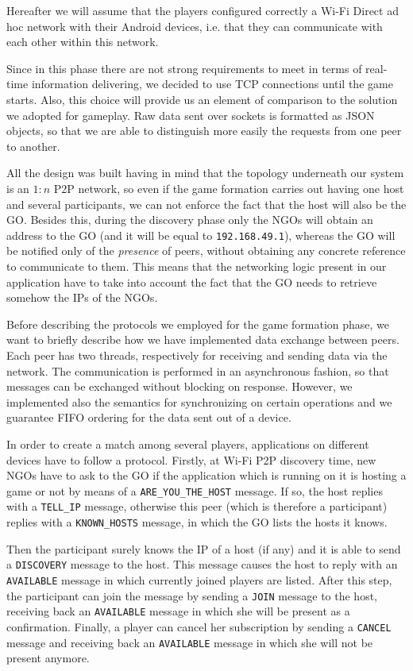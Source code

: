 Hereafter we will assume that the players configured correctly a Wi-Fi Direct
ad hoc network with their Android devices, i.e. that they can communicate with
each other within this network.

Since in this phase there are not strong requirements to meet in terms of
real-time information delivering, we decided to use TCP connections until the
game starts. Also, this choice will provide us an element of comparison to the
solution we adopted for gameplay.
Raw data sent over sockets is formatted as JSON objects, so that we are able to
distinguish more easily the requests from one peer to another.

All the design was built having in mind that the topology underneath our system
is an $1:n$ P2P network, so even if the game formation carries out having one
host and several participants, we can not enforce the fact that the host will
also be the GO. Besides this, during the discovery phase only the NGOs will
obtain an address to the GO (and it will be equal to \texttt{192.168.49.1}),
whereas the GO will be notified only of the \textit{presence} of peers, without
obtaining any concrete reference to communicate to them. This means that the
networking logic present in our application have to take into account the fact
that the GO needs to retrieve somehow the IPs of the NGOs.

Before describing the protocols we employed for the game formation phase, we
want to briefly describe how we have implemented data exchange between peers.
Each peer has two threads, respectively for receiving and sending data via the
network. The communication is performed in an asynchronous fashion, so that
messages can be exchanged without blocking on response. However, we implemented
also the semantics for synchronizing on certain operations and we guarantee FIFO
ordering for the data sent out of a device.

In order to create a match among several players, applications on different
devices have to follow a protocol. Firstly, at Wi-Fi P2P discovery time, new
NGOs have to ask to the GO if the application which is running on it is hosting
a game or not by means of a \texttt{ARE\_YOU\_THE\_HOST} message. If so, the
host replies with a \texttt{TELL\_IP} message, otherwise this peer (which is
therefore a participant) replies with a \texttt{KNOWN\_HOSTS} message, in which
the GO lists the hosts it knows.

Then the participant surely knows the IP of a host (if any) and it is able to
send a \texttt{DISCOVERY} message to the host. This message causes the host to
reply with an \texttt{AVAILABLE} message in which currently joined players are
listed. After this step, the participant can join the message by sending a
\texttt{JOIN} message to the host, receiving back an \texttt{AVAILABLE} message
in which she will be present as a confirmation. Finally, a player can cancel
her subscription by sending a \texttt{CANCEL} message and receiving back an
\texttt{AVAILABLE} message in which she will not be present anymore.

